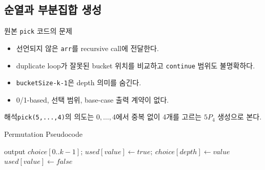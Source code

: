 \subsection{순열과 부분집합 생성}
\begin{frame}{원본 \texttt{pick} 코드의 문제}
\begin{itemize}
\item 선언되지 않은 \texttt{arr}를 recursive call에 전달한다.
\item duplicate loop가 잘못된 bucket 위치를 비교하고 \texttt{continue} 범위도 불명확하다.
\item \texttt{bucketSize-k-1}은 depth 의미를 숨긴다.
\item 0/1-based, 선택 범위, base-case 출력 계약이 없다.
\end{itemize}
\begin{alertblock}{해석}\texttt{pick(5,...,4)}의 의도는 \(0,\ldots,4\)에서 중복 없이 4개를 고르는 \(5P_4\) 생성으로 본다.\end{alertblock}
\end{frame}
\begin{frame}{Permutation Pseudocode}
\algofont\begin{algorithmic}[1]
\State output \(choice[0..k-1]\); \Return\EndIf
{}
\State \(used[value]\gets true;\ choice[depth]\gets value\)
\State {}
\State \(used[value]\gets false\)
\EndIf\EndFor
\EndProcedure
\end{algorithmic}
\end{frame}
